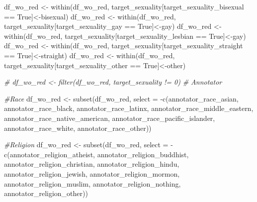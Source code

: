 \documentclass[
]{article}
\newenvironment{Shaded}{\begin{snugshade}}{\end{snugshade}}
\newcommand{\AttributeTok}[1]{\textcolor[rgb]{0.77,0.63,0.00}{#1}}
\newcommand{\CommentTok}[1]{\textcolor[rgb]{0.56,0.35,0.01}{\textit{#1}}}
\newcommand{\FunctionTok}[1]{\textcolor[rgb]{0.00,0.00,0.00}{#1}}
\newcommand{\NormalTok}[1]{#1}
\newcommand{\OtherTok}[1]{\textcolor[rgb]{0.56,0.35,0.01}{#1}}
\newcommand{\SpecialCharTok}[1]{\textcolor[rgb]{0.00,0.00,0.00}{#1}}
\newcommand{\StringTok}[1]{\textcolor[rgb]{0.31,0.60,0.02}{#1}}
\begin{document}
\begin{Shaded}
\begin{Highlighting}[]
\NormalTok{df\_wo\_red }\OtherTok{\textless{}{-}} \FunctionTok{within}\NormalTok{(df\_wo\_red, target\_sexuality[target\_sexuality\_bisexual }\SpecialCharTok{==} \StringTok{\textquotesingle{}True\textquotesingle{}}\NormalTok{]}\OtherTok{\textless{}{-}}\StringTok{\textquotesingle{}bisexual\textquotesingle{}}\NormalTok{)}
\NormalTok{df\_wo\_red }\OtherTok{\textless{}{-}} \FunctionTok{within}\NormalTok{(df\_wo\_red, target\_sexuality[target\_sexuality\_gay }\SpecialCharTok{==} \StringTok{\textquotesingle{}True\textquotesingle{}}\NormalTok{]}\OtherTok{\textless{}{-}}\StringTok{\textquotesingle{}gay\textquotesingle{}}\NormalTok{)}
\NormalTok{df\_wo\_red }\OtherTok{\textless{}{-}} \FunctionTok{within}\NormalTok{(df\_wo\_red, target\_sexuality[target\_sexuality\_lesbian }\SpecialCharTok{==} \StringTok{\textquotesingle{}True\textquotesingle{}}\NormalTok{]}\OtherTok{\textless{}{-}}\StringTok{\textquotesingle{}gay\textquotesingle{}}\NormalTok{)}
\NormalTok{df\_wo\_red }\OtherTok{\textless{}{-}} \FunctionTok{within}\NormalTok{(df\_wo\_red, target\_sexuality[target\_sexuality\_straight }\SpecialCharTok{==} \StringTok{\textquotesingle{}True\textquotesingle{}}\NormalTok{]}\OtherTok{\textless{}{-}}\StringTok{\textquotesingle{}straight\textquotesingle{}}\NormalTok{)}
\NormalTok{df\_wo\_red }\OtherTok{\textless{}{-}} \FunctionTok{within}\NormalTok{(df\_wo\_red, target\_sexuality[target\_sexuality\_other }\SpecialCharTok{==} \StringTok{\textquotesingle{}True\textquotesingle{}}\NormalTok{]}\OtherTok{\textless{}{-}}\StringTok{\textquotesingle{}other\textquotesingle{}}\NormalTok{)}

\CommentTok{\# df\_wo\_red \textless{}{-} filter(df\_wo\_red, target\_sexuality != 0)}
\CommentTok{\# Annotator}

 \CommentTok{\#Race}
\NormalTok{df\_wo\_red }\OtherTok{\textless{}{-}} \FunctionTok{subset}\NormalTok{(df\_wo\_red, }\AttributeTok{select =} \SpecialCharTok{{-}}\FunctionTok{c}\NormalTok{(annotator\_race\_asian, annotator\_race\_black, annotator\_race\_latinx, annotator\_race\_middle\_eastern, annotator\_race\_native\_american, annotator\_race\_pacific\_islander, annotator\_race\_white, annotator\_race\_other))}

 \CommentTok{\#Religion}
\NormalTok{df\_wo\_red }\OtherTok{\textless{}{-}} \FunctionTok{subset}\NormalTok{(df\_wo\_red, }\AttributeTok{select =} \SpecialCharTok{{-}}\FunctionTok{c}\NormalTok{(annotator\_religion\_atheist, annotator\_religion\_buddhist, annotator\_religion\_christian, annotator\_religion\_hindu, annotator\_religion\_jewish, annotator\_religion\_mormon, annotator\_religion\_muslim, annotator\_religion\_nothing, annotator\_religion\_other))}


\end{Highlighting}
\end{Shaded}
\end{document}
